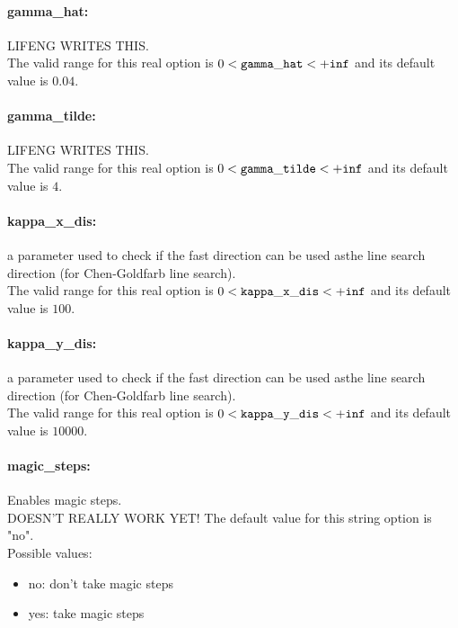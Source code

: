 \paragraph{gamma\_hat:}\label{opt:gamma_hat} LIFENG WRITES THIS. \\
 The valid range for this real option is 
$0 <  {\tt gamma\_hat } <  {\tt +inf}$
and its default value is $0.04$.


\paragraph{gamma\_tilde:}\label{opt:gamma_tilde} LIFENG WRITES THIS. \\
 The valid range for this real option is 
$0 <  {\tt gamma\_tilde } <  {\tt +inf}$
and its default value is $4$.


\paragraph{kappa\_x\_dis:}\label{opt:kappa_x_dis} a parameter used to check if the fast direction can be used asthe line search direction (for Chen-Goldfarb line search). \\
 The valid range for this real option is 
$0 <  {\tt kappa\_x\_dis } <  {\tt +inf}$
and its default value is $100$.


\paragraph{kappa\_y\_dis:}\label{opt:kappa_y_dis} a parameter used to check if the fast direction can be used asthe line search direction (for Chen-Goldfarb line search). \\
 The valid range for this real option is 
$0 <  {\tt kappa\_y\_dis } <  {\tt +inf}$
and its default value is $10000$.


\paragraph{magic\_steps:}\label{opt:magic_steps} Enables magic steps. \\
 DOESN'T REALLY WORK YET! The default value for this string option is "no".
\\ 
Possible values:
\begin{itemize}
   \item no: don't take magic steps
   \item yes: take magic steps
\end{itemize}

